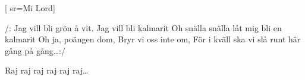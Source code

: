 
[
sr={Mi Lord}]

\beginverse*
/: Jag vill bli grön å vit.
Jag vill bli kalmarit
Oh snälla snälla låt mig bli en kalmarit
Oh ja, poängen dom,
Bryr vi oss inte om,
För i kväll ska vi slå runt här gång på gång…:/
\endverse

\beginchorus
Raj raj raj raj raj raj…
\endchorus
\endsong